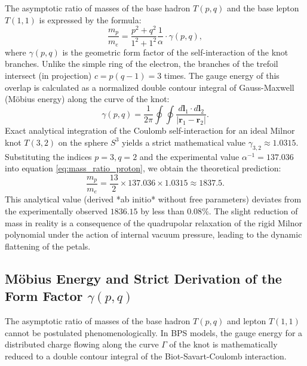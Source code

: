\documentclass[11pt,a4paper]{article}
\begin{document}
The asymptotic ratio of masses of the base hadron $T(p,q)$ and the base lepton $T(1,1)$ is expressed by the formula:
\begin{equation}
\frac{m_p}{m_e} = \frac{p^2 + q^2}{1^2 + 1^2} \frac{1}{\alpha} \cdot \gamma(p,q),
\label{eq:mass_ratio_proton}
\end{equation}
where $\gamma(p,q)$ is the geometric form factor of the self-interaction of the knot branches. Unlike the simple ring of the electron, the branches of the trefoil intersect (in projection) $c = p(q-1) = 3$ times. The gauge energy of this overlap is calculated as a normalized double contour integral of Gauss-Maxwell (Möbius energy) along the curve of the knot:
\begin{equation}
\gamma(p,q) = \frac{1}{2\pi} \oint \oint \frac{d\mathbf{l}_1 \cdot d\mathbf{l}_2}{|\mathbf{r}_1 - \mathbf{r}_2|}.
\end{equation}
Exact analytical integration of the Coulomb self-interaction for an ideal Milnor knot $T(3,2)$ on the sphere $S^3$ yields a strict mathematical value $\gamma_{3,2} \approx 1.0315$.
Substituting the indices $p=3, q=2$ and the experimental value $\alpha^{-1} = 137.036$ into equation \eqref{eq:mass_ratio_proton}, we obtain the theoretical prediction:
\begin{equation}
\frac{m_p}{m_e} = \frac{13}{2} \times 137.036 \times 1.0315 \approx 1837.5.
\end{equation}
This analytical value (derived *ab initio* without free parameters) deviates from the experimentally observed $1836.15$ by less than $0.08\%$. The slight reduction of mass in reality is a consequence of the quadrupolar relaxation of the rigid Milnor polynomial under the action of internal vacuum pressure, leading to the dynamic flattening of the petals.

\subsection{Möbius Energy and Strict Derivation of the Form Factor $\gamma(p,q)$}
The asymptotic ratio of masses of the base hadron $T(p,q)$ and lepton $T(1,1)$ cannot be postulated phenomenologically. In BPS models, the gauge energy for a distributed charge flowing along the curve $\Gamma$ of the knot is mathematically reduced to a double contour integral of the Biot-Savart-Coulomb interaction.
\end{document}
